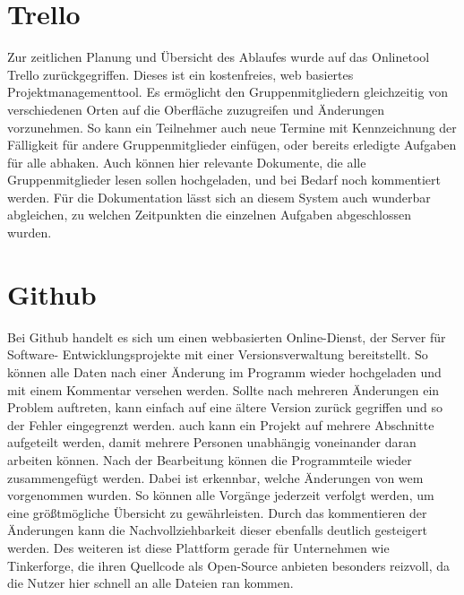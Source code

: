
\section{Trello}
Zur zeitlichen Planung und Übersicht des Ablaufes wurde auf das Onlinetool Trello zurückgegriffen. Dieses ist ein kostenfreies, web basiertes Projektmanagementtool. Es ermöglicht den Gruppenmitgliedern gleichzeitig von verschiedenen Orten auf die Oberfläche zuzugreifen und Änderungen vorzunehmen. So kann ein Teilnehmer auch neue Termine mit Kennzeichnung der Fälligkeit für andere Gruppenmitglieder einfügen, oder bereits erledigte Aufgaben für alle abhaken. Auch können hier relevante Dokumente, die alle Gruppenmitglieder lesen sollen hochgeladen, und bei Bedarf noch kommentiert werden. Für die Dokumentation lässt sich an diesem System auch wunderbar abgleichen, zu welchen Zeitpunkten die einzelnen Aufgaben abgeschlossen wurden.

\section{Github}
Bei Github handelt es sich um einen webbasierten Online-Dienst, der Server für Software- Entwicklungsprojekte mit einer Versionsverwaltung bereitstellt. So können alle Daten nach einer Änderung im Programm wieder hochgeladen und mit einem Kommentar versehen werden. Sollte nach mehreren Änderungen ein Problem auftreten, kann einfach auf eine ältere Version zurück gegriffen und so der Fehler eingegrenzt werden. auch kann ein Projekt auf mehrere Abschnitte aufgeteilt werden, damit mehrere Personen unabhängig voneinander daran arbeiten können. Nach der Bearbeitung können die Programmteile wieder zusammengefügt werden. Dabei ist erkennbar, welche Änderungen von wem vorgenommen wurden. So können alle Vorgänge jederzeit verfolgt werden, um eine größtmögliche Übersicht zu gewährleisten. Durch das kommentieren der Änderungen kann die Nachvollziehbarkeit dieser ebenfalls deutlich gesteigert werden. Des weiteren ist diese Plattform gerade für Unternehmen wie Tinkerforge, die ihren Quellcode als Open-Source anbieten besonders reizvoll, da die Nutzer hier schnell an alle Dateien ran kommen.